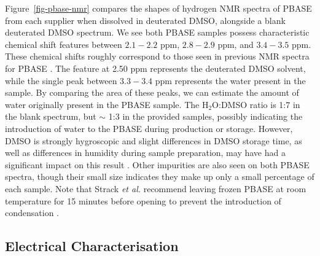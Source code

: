 \documentclass[
  a4paper,
]{scrbook}
\begin{document}
Figure~\ref{fig-pbase-nmr} compares the shapes of hydrogen NMR spectra
of PBASE from each supplier when dissolved in deuterated DMSO, alongside
a blank deuterated DMSO spectrum. We see both PBASE samples possess
characteristic chemical shift features between \(2.1-2.2\) ppm,
\(2.8-2.9\) ppm, and \(3.4-3.5\) ppm. These chemical shifts roughly
correspond to those seen in previous NMR spectra for PBASE
\autocite{NMR2}. The feature at 2.50 ppm represents the deuterated DMSO
solvent, while the single peak between \(3.3-3.4\) ppm represents the
water present in the sample. By comparing the area of these peaks, we
can estimate the amount of water originally present in the PBASE sample.
The H\(_{2}\)O:DMSO ratio is 1:7 in the blank spectrum, but \(\sim\) 1:3
in the provided samples, possibly indicating the introduction of water
to the PBASE during production or storage. However, DMSO is strongly
hygroscopic and slight differences in DMSO storage time, as well as
differences in humidity during sample preparation, may have had a
significant impact on this result \autocite{Lebel1962}. Other impurities
are also seen on both PBASE spectra, though their small size indicates
they make up only a small percentage of each sample. Note that Strack
\emph{et al.} recommend leaving frozen PBASE at room temperature for 15
minutes before opening to prevent the introduction of condensation
\autocite{Strack2013}.

\hypertarget{electrical-characterisation}{%
\subsection{Electrical
Characterisation}\label{electrical-characterisation}}
\end{document}
